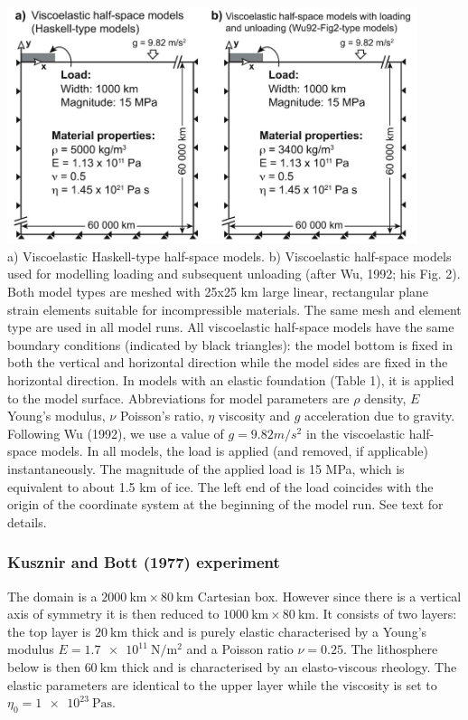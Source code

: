 \begin{center}
\includegraphics[width=12cm]{images/viscoelasticity/halk19}\\
{\captionfont 
a) Viscoelastic Haskell-type half-space models. b) Viscoelastic  half-space models used for modelling loading and subsequent
unloading (after Wu, 1992; his Fig. 2). Both model types are meshed with 25x25 km large linear, rectangular plane strain elements suitable for incompressible materials. 
The same mesh and element type are used in all model runs. All viscoelastic half-space models have the same boundary conditions (indicated by black triangles): the model bottom is fixed in both the vertical and horizontal direction while the model sides are fixed in the horizontal direction. In models with an elastic foundation (Table 1), it is applied to the model surface. Abbreviations for model parameters are $\rho$ density, $E$ Young's modulus, $\nu$ Poisson's ratio, $\eta$ viscosity and $g$ acceleration due to gravity. Following Wu (1992), we use a value of $g = 9.82 m/s^2$ in the viscoelastic
half-space models. 
In all models, the load is applied (and removed, if applicable) instantaneously. The magnitude of the applied load is 15 MPa, which is equivalent to about 1.5 km of ice. The left end of
the load coincides with the origin of the coordinate system at the beginning of the model run. See text for details.
}
\end{center}


\subsubsection{Kusznir and Bott (1977) experiment}

The domain is a $\SI{2000}{\km}\times\SI{80}{\km}$ Cartesian box. 
However since there is a vertical axis of symmetry it is then reduced to 
$\SI{1000}{\km}\times\SI{80}{\km}$.
It consists of two layers: the top layer is $\SI{20}{\km}$ thick and is 
purely elastic characterised by a Young's modulus $E=\SI{1.7e11}{\newton\per\square\meter}$ and a Poisson ratio $\nu=0.25$.
The lithosphere below is then $\SI{60}{\km}$ thick and is characterised by an elasto-viscous rheology. The elastic parameters are identical to the upper layer while the viscosity is set to $\eta_0=\SI{1e23}{\pascal\second}$.

